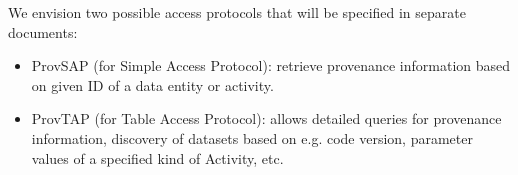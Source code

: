 \label{sec:access_protocols}
We envision two possible access protocols that will be specified in separate documents:
\begin{itemize}
\item ProvSAP (for Simple Access Protocol): retrieve provenance information based on given ID of a data entity or activity.
\item ProvTAP (for Table Access Protocol): allows detailed queries for provenance information, discovery of datasets based on e.g. code version, parameter values of a specified kind of Activity, etc.
\end{itemize}

%




